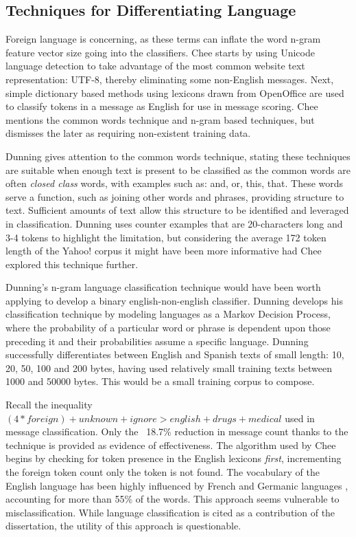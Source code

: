 \documentclass[twoside,11pt]{article}
\begin{document}
\subsection{Techniques for Differentiating Language}
Foreign language is concerning, as these terms can inflate the word n-gram feature vector size going into the classifiers. Chee starts by using Unicode language detection to take advantage of the most common website text representation: UTF-8, thereby eliminating some non-English messages. Next, simple dictionary based methods using lexicons drawn from OpenOffice are used to classify tokens in a message as English for use in message scoring. Chee mentions the common words technique and n-gram based techniques, but dismisses the later as requiring non-existent training data.
\par Dunning \citet{Dunning} gives attention to the common words technique, stating these techniques are suitable when enough text is present to be classified as the common words are often \textit{closed class} words, with examples such as: and, or, this, that. These words serve a function, such as joining other words and phrases, providing structure to text. Sufficient amounts of text allow this structure to be identified and leveraged in classification. Dunning uses counter examples that are 20-characters long and 3-4 tokens to highlight the limitation, but considering the average 172 token length of the Yahoo! corpus it might have been more informative had Chee explored this technique further.
\par Dunning's n-gram language classification technique would have been worth applying to develop a binary english-non-english classifier. Dunning develops his classification technique by modeling languages as a Markov Decision Process, where the probability of a particular word or phrase is dependent upon those preceding it and their probabilities assume a specific language. Dunning successfully differentiates between English and Spanish texts of small length: 10, 20, 50, 100 and 200 bytes, having used relatively small training texts between 1000 and 50000 bytes. This would be a small training corpus to compose.
\par Recall the inequality $(4 * foreign) + unknown + ignore > english + drugs + medical$ used in message classification. Only the ~18.7\% reduction in message count thanks to the technique is provided as evidence of effectiveness. The algorithm used by Chee begins by checking for token presence in the English lexicons \textit{first}, incrementing the foreign token count only the token is not found. The vocabulary of the English language has been highly influenced by French and Germanic languages \citep{English}, accounting for more than 55\% of the words. This approach seems vulnerable to misclassification. While language classification is cited as a contribution of the dissertation, the utility of this approach is questionable.
\end{document}
